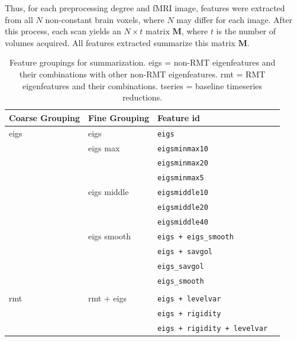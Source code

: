 \documentclass[12pt]{spieman}  %
\newcommand{\tcode}[1]{\footnotesize\texttt{#1}\normalsize}
\begin{document}
\begin{spacing}{2}
Thus, for each preprocessing degree and fMRI image, features were extracted
from all \(N\) non-constant brain voxels, where \(N\) may differ for each
image. After this process, each scan yields an \(N \times t\) matrix
\(\mathbf{M}\), where \(t\) is the number of volumes acquired. All features
extracted summarize this matrix \(\mathbf{M}\).

\begin{table}[h!]
\caption{
\label{tab:features}
Feature groupings for summarization. eigs = non-RMT eigenfeatures and their
combinations with other non-RMT eigenfeatures. rmt = RMT eigenfeatures and
their combinations. tseries = baseline timeseries reductions.\\
}
\small
\centering
\begin{tabular}{lllr}
\hline
\textbf{Coarse Grouping} & \textbf{Fine Grouping} & \textbf{Feature id} \\
\hline
eigs           & eigs          & \tcode{eigs}                           \\
               & eigs max      & \tcode{eigsminmax10}                   \\
               &               & \tcode{eigsminmax20}                   \\
               &               & \tcode{eigsminmax5}                    \\
               & eigs middle   & \tcode{eigsmiddle10}                   \\
               &               & \tcode{eigsmiddle20}                   \\
               &               & \tcode{eigsmiddle40}                   \\
               & eigs smooth   & \tcode{eigs + eigs\_smooth}            \\
               &               & \tcode{eigs + savgol}                  \\
               &               & \tcode{eigs\_savgol}                   \\
               &               & \tcode{eigs\_smooth}                   \\
               &               &                                        \\
rmt            & rmt + eigs    & \tcode{eigs + levelvar}                \\
               &               & \tcode{eigs + rigidity}                \\
               &               & \tcode{eigs + rigidity + levelvar}     \\

\end{tabular}
\end{table}
\end{spacing}
\end{document}
